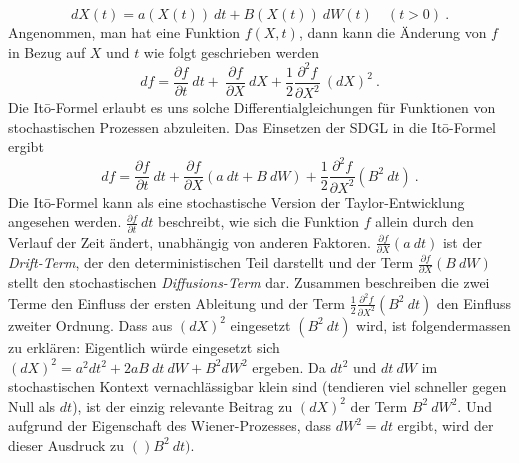 \begin{equation}
	dX(t) = a(X(t)) \ dt + B(X(t)) \ dW(t) \quad (t>0) \ .
\end{equation}
Angenommen, man hat eine Funktion $ f(X,t) $, dann kann die Änderung von $ f $ in Bezug auf $ X $ und $ t $ wie folgt geschrieben werden
\begin{equation}
	df = \frac{\partial f}{\partial t} \ dt + \ \frac{\partial f}{\partial X} \ dX + \frac{1}{2} \frac{\partial^2 f} {\partial X^2} \ (dX)^2 \ .	
\end{equation}
Die Itō-Formel erlaubt es uns solche Differentialgleichungen für Funktionen von stochastischen Prozessen abzuleiten. Das Einsetzen der SDGL in die Itō-Formel ergibt
\begin{equation}
	df = \frac{\partial f}{\partial t} \ dt + \frac{\partial f}{\partial X} (a \ dt + B \ dW) + \frac{1}{2} \frac{\partial^2 f}{\partial X^2} (B^2 \ dt) \ .
\end{equation}
Die Itō-Formel kann als eine stochastische Version der Taylor-Entwicklung
angesehen werden. $ \frac{\partial f}{\partial t} \ dt $ beschreibt,
wie sich die Funktion $ f $ allein durch den Verlauf der Zeit ändert,
unabhängig von anderen Faktoren. $ \frac{\partial f}{\partial X}
(a \ dt) $ ist der \textit{Drift-Term}, der den deterministischen
Teil darstellt und der Term $  \frac{\partial f}{\partial X} (B \
dW) $ stellt den stochastischen \textit{Diffusions-Term} dar.
Zusammen beschreiben die zwei Terme den Einfluss der ersten Ableitung
und der Term $ \frac{1}{2} \frac{\partial^2 f}{\partial X^2} (B^2
\ dt) $ den Einfluss zweiter Ordnung. Dass aus $ (dX)^2 $ eingesetzt
$ (B^2 \ dt) $ wird, ist folgendermassen zu erklären:
Eigentlich würde eingesetzt sich $ (dX)^2 = a^2 dt^2 + 2a B \ dt \ dW + B^2 dW^2 $ ergeben. Da $ dt^2 $ und $ dt \ dW $ im stochastischen Kontext vernachlässigbar klein sind (tendieren viel schneller gegen Null als $ dt $), ist der einzig relevante Beitrag zu $ (dX)^2 $ der Term $ B^2 \ dW^2 $. Und aufgrund der Eigenschaft des Wiener-Prozesses, dass $ dW^2 = dt $ ergibt, wird der dieser Ausdruck zu $ ()B^2 \ dt) $.




